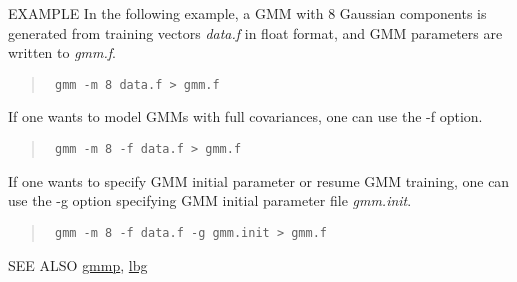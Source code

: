 \begin{options}
\end{options}

\begin{qsection}{EXAMPLE}
In the following example, a GMM with 8 Gaussian components is generated
from training vectors {\em data.f} in float format, and GMM parameters
are written to {\em gmm.f}.
\begin{quote}
\verb! gmm -m 8 data.f > gmm.f!
\end{quote}
If one wants to model GMMs with full covariances,
 one can use the -f option.
\begin{quote}
\verb! gmm -m 8 -f data.f > gmm.f! 
\end{quote}
If one wants to specify GMM initial parameter or resume GMM training,
 one can use the -g option specifying GMM initial parameter file {\em gmm.init}.
\begin{quote}
\verb! gmm -m 8 -f data.f -g gmm.init > gmm.f! 
\end{quote}

\end{qsection}

\begin{qsection}{SEE ALSO}
\hyperlink{gmmp}{gmmp},
\hyperlink{lbg}{lbg}
\end{qsection}

